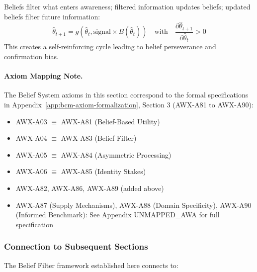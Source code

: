 \begin{tcolorbox}[colback=gray!5!white, colframe=gray!75!black, title=Axiom AWX-A89: Belief-Awareness Feedback Loop]
Beliefs filter what enters awareness; filtered information updates beliefs; 
updated beliefs filter future information:
\begin{equation}
\hat{\theta}_{t+1} = g(\hat{\theta}_t, \text{signal} \times B(\hat{\theta}_t)) 
\quad \text{with} \quad \frac{\partial \hat{\theta}_{t+1}}{\partial \hat{\theta}_t} > 0
\end{equation}
This creates a self-reinforcing cycle leading to belief perseverance and 
confirmation bias.
\end{tcolorbox}

\paragraph{Axiom Mapping Note.}
The Belief System axioms in this section correspond to the formal specifications 
in Appendix~\ref{app:bcm-axiom-formalization}, Section 3 (AWX-A81 to AWX-A90):
\begin{itemize}
    \item AWX-A03 $\equiv$ AWX-A81 (Belief-Based Utility)
    \item AWX-A04 $\equiv$ AWX-A83 (Belief Filter)
    \item AWX-A05 $\equiv$ AWX-A84 (Asymmetric Processing)
    \item AWX-A06 $\equiv$ AWX-A85 (Identity Stakes)
    \item AWX-A82, AWX-A86, AWX-A89 (added above)
    \item AWX-A87 (Supply Mechanisms), AWX-A88 (Domain Specificity), 
          AWX-A90 (Informed Benchmark): See Appendix UNMAPPED_AWA for full specification
\end{itemize}

\subsubsection{Connection to Subsequent Sections}
\label{subsubsec:connections}

The Belief Filter framework established here connects to:

